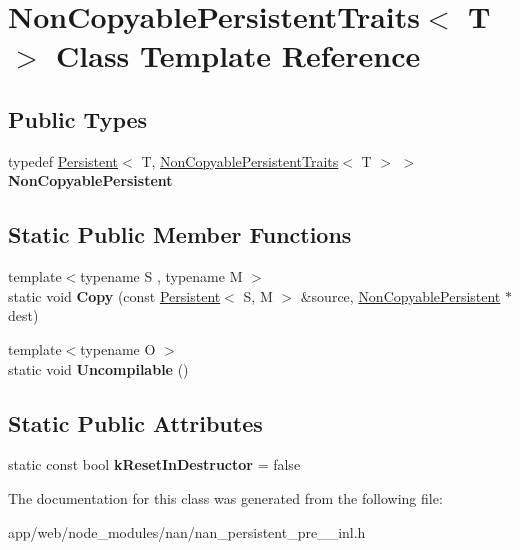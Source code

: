 \hypertarget{class_non_copyable_persistent_traits}{}\section{Non\+Copyable\+Persistent\+Traits$<$ T $>$ Class Template Reference}
\label{class_non_copyable_persistent_traits}
\subsection*{Public Types}
\begin{DoxyCompactItemize}
\item 
\mbox{\label{class_non_copyable_persistent_traits_a70ee074e7a2c7b80caf3201cc31fff70}} 
typedef \hyperlink{class_persistent}{Persistent}$<$ T, \hyperlink{class_non_copyable_persistent_traits}{Non\+Copyable\+Persistent\+Traits}$<$ T $>$ $>$ {\bfseries Non\+Copyable\+Persistent}
\end{DoxyCompactItemize}
\subsection*{Static Public Member Functions}
\begin{DoxyCompactItemize}
\item 
\mbox{\label{class_non_copyable_persistent_traits_a52e11b8e7461bdd943fae0ca66a8d29b}} 
{\footnotesize template$<$typename S , typename M $>$ }\\static void {\bfseries Copy} (const \hyperlink{class_persistent}{Persistent}$<$ S, M $>$ \&source, \hyperlink{class_persistent}{Non\+Copyable\+Persistent} $\ast$dest)
\item 
\mbox{\label{class_non_copyable_persistent_traits_aff5c8dcd8a03597c621a385158d1b877}} 
{\footnotesize template$<$typename O $>$ }\\static void {\bfseries Uncompilable} ()
\end{DoxyCompactItemize}
\subsection*{Static Public Attributes}
\begin{DoxyCompactItemize}
\item 
\mbox{\label{class_non_copyable_persistent_traits_a667f0d4f64673a0452976959ab78b7c8}} 
static const bool {\bfseries k\+Reset\+In\+Destructor} = false
\end{DoxyCompactItemize}


The documentation for this class was generated from the following file\+:\begin{DoxyCompactItemize}
\item 
app/web/node\+\_\+modules/nan/nan\+\_\+persistent\+\_\+pre\+\_\+\_\+inl.\+h\end{DoxyCompactItemize}
